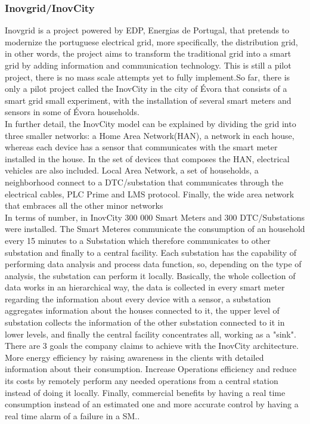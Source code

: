 \subsubsection{Inovgrid/InovCity}Inovgrid\cite{matos2013inovgrid} is a project powered by EDP, Energias de Portugal, that pretends to modernize the portuguese electrical grid, more specifically, the distribution grid, in other words, the project aims to transform the traditional grid into a smart grid by adding information and communication technology. This is still a pilot project, there is no mass scale attempts yet to fully implement.So far, there is only a pilot project called the InovCity in the city of Évora that consists of a smart grid small experiment, with the installation of several smart meters and sensors in some of Évora households. \\
In further detail, the InovCity model can be explained by dividing the grid into three smaller networks: a Home Area Network(HAN), a network in each house, whereas each device has a sensor that communicates with the smart meter installed in the house. In the set of devices that composes the HAN, electrical vehicles are also included.
Local Area Network, a set of households, a neighborhood connect to a DTC/substation that communicates through the electrical cables, PLC Prime and LMS protocol. Finally, the wide area network that embraces all the other minor networks\\
In terms of number, in InovCity 300 000 Smart Meters and 300 DTC/Substations were installed. The Smart Meteres communicate the consumption of an household every 15 minutes to a Substation which therefore communicates to other substation and finally to a central facility. Each substation has the capability of performing data analysis and process data function, so, depending on the type of analysis, the substation can perform it locally. Basically, the whole collection of data works in an hierarchical way, the data is collected in every smart meter regarding the information about every device with a sensor, a substation aggregates information about the houses connected to it, the upper level of substation collects the information of the other substation connected to it in lower levels, and finally the central facility concentrates all, working as a "sink".\\
There are 3 goals the company claims to achieve with the InovCity architecture. More energy efficiency by raising awareness in the clients with detailed information about their consumption. Increase Operations efficiency and reduce its costs by remotely perform any needed operations from a central station instead of doing it locally. Finally, commercial benefits by having a real time consumption instead of an estimated one and more accurate control by having a real time alarm of a failure in a SM..
